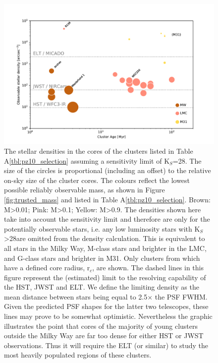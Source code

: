 \begin{figure}

    \centering
    \includegraphics[width=\textwidth]{images/star_density_vs_age}

    \caption{The stellar densities in the cores of the clusters listed in Table
     A\ref{tbl:pz10_selection} assuming a sensitivity limit of K$_S$=28\m. The
     size of the circles is proportional (including an offset) to the relative
     on-sky size of the cluster cores. The colours reflect the lowest possible
     reliably observable mass, as shown in Figure \ref{fig:trusted_mass} and
     listed in Table A\ref{tbl:pz10_selection}. Brown: M\textgreater0.01\msun;
     Pink: M\textgreater0.1\msun; Yellow: M\textgreater0.9\msun. The densities
     shown here take into account the sensitivity limit and therefore are only
     for the potentially observable stars, i.e. any low luminosity stars with
     K$_S$\textgreater28\m are omitted from the density calculation. This is
     equivalent to all stars in the Milky Way, M-class stars and brighter in
     the LMC, and G-class stars and brighter in M31. Only clusters from
     \citet{portegies2010} which have a defined core radius, r$_c$, are shown.
     The dashed lines in this figure represent the (estimated) limit to the resolving
     capability of the HST, JWST and ELT. We define the limiting density as
     the mean distance between stars being equal to 2.5$\times$ the PSF FWHM.
     Given the predicted PSF shapes for the latter two telescopes, these lines
     may prove to be somewhat optimistic. Nevertheless the graphic
     illustrates the point that cores of the majority of young clusters outside the Milky Way are
     far too dense for either HST or JWST observations. Thus it will require
     the ELT (or similar) to study the most heavily populated regions of
     these clusters.}
    
    \label{fig:star_density_vs_age}
    
\end{figure}



